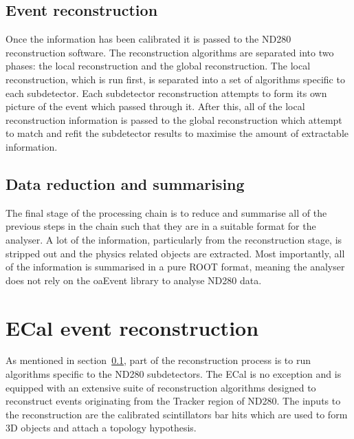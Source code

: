 \subsection{Event reconstruction}
\label{subsec:EventReconstruction}
Once the information has been calibrated it is passed to the ND280 reconstruction software.  The reconstruction algorithms are separated into two phases: the local reconstruction and the global reconstruction.  The local reconstruction, which is run first, is separated into a set of algorithms specific to each subdetector.  Each subdetector reconstruction attempts to form its own picture of the event which passed through it.  After this, all of the local reconstruction information is passed to the global reconstruction which attempt to match and refit the subdetector results to maximise the amount of extractable information.

\subsection{Data reduction and summarising}
\label{subsec:DataReduction}
The final stage of the processing chain is to reduce and summarise all of the previous steps in the chain such that they are in a suitable format for the analyser.  A lot of the information, particularly from the reconstruction stage, is stripped out and the physics related objects are extracted.  Most importantly, all of the information is summarised in a pure ROOT format, meaning the analyser does not rely on the oaEvent library to analyse ND280 data.


\section{ECal event reconstruction}
\label{sec:ECalEventReconstruction}
As mentioned in section~\ref{subsec:EventReconstruction}, part of the reconstruction process is to run algorithms specific to the ND280 subdetectors.  The ECal is no exception and is equipped with an extensive suite of reconstruction algorithms designed to reconstruct events originating from the Tracker region of ND280.  The inputs to the reconstruction are the calibrated scintillators bar hits which are used to form 3D objects and attach a topology hypothesis.

